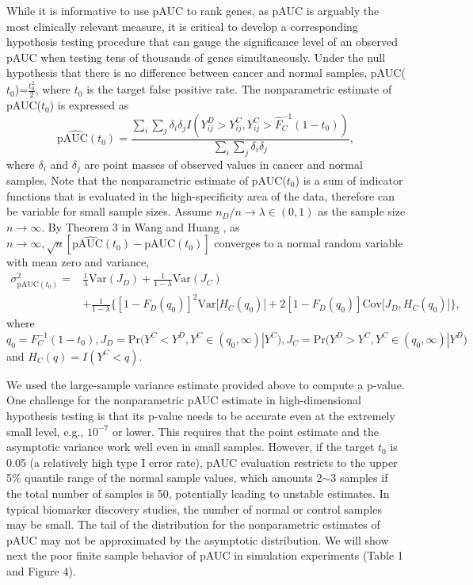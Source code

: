 \documentclass{statsoc}
\begin{document}
While it is informative to use pAUC to rank genes, as pAUC is arguably the most clinically relevant measure, it is critical to develop a corresponding hypothesis testing procedure that can gauge the significance level of an observed pAUC when testing tens of thousands of genes simultaneously. Under the null hypothesis that there is no difference between cancer and normal samples,  pAUC($t_0$)=$\frac{t_0^2}{2}$, where $t_0$ is the target false positive rate. The nonparametric estimate of pAUC($t_0$) is expressed as
\begin{equation}
\mbox{p}\widehat{\mbox{AUC}}(t_0) = \frac{\sum_i \sum_j \delta_i \delta_j I(Y_{ij}^D > Y_{ij}^C, Y_{ij}^C > \hat{F}^{-1}_C(1-t_0))}{\sum_i \sum_j \delta_i \delta_j}, \nonumber
\end{equation}
where $\delta_i$ and $\delta_j$ are point masses of observed values in cancer and normal samples.  Note that the nonparametric estimate of pAUC($t_0$) is a sum of indicator functions that is evaluated in the high-specificity area of the data, therefore can be variable for small sample sizes.  Assume $n_D/n \rightarrow \lambda \in (0,1)$ as the sample size $n \rightarrow \infty$.  By Theorem 3 in Wang and Huang \citep{Wang2019},  as $n \rightarrow \infty, \sqrt{n}[\mbox{p}\widehat{\mbox{AUC}}(t_0)-\mbox{pAUC}(t_0)]$ converges to a normal random variable with mean zero and variance,
\begin{align*}
    \sigma_{\mbox{pAUC}(t_0)}^2 = & \frac{1}{\lambda}\mbox{Var}(J_D)+ \frac{1}{1-\lambda}\mbox{Var}(J_C) \\
    &+ \frac{1}{1-\lambda}\Big\{[1-F_D(q_0)]^2\mbox{Var}\big[H_C(q_0)\big]+2[1-F_D(q_0)]\mbox{Cov}\big[J_D,H_C(q_0)\big]\Big\},
\end{align*}
where $q_0=F_C^{-1}(1-t_0), J_D=\mbox{Pr}\big(Y^C<Y^D,Y^C\in (q_0,\infty)|Y^C\big), J_C=\mbox{Pr}\big(Y^D>Y^C,Y^C\in (q_0,\infty)|Y^D\big)$ and $H_C(q)=I(Y^C<q)$.

We used the large-sample variance estimate provided above to compute a p-value. One challenge for the nonparametric pAUC estimate in high-dimensional hypothesis testing is that its p-value needs to be accurate even at the extremely small level, e.g., $10^{-7}$ or lower. This requires that the point estimate and the asymptotic variance work well even in small samples. However, if the target $t_0$ is 0.05 (a relatively high type I error rate), pAUC evaluation restricts to the upper 5\% quantile range of the normal sample values, which amounts 2$\sim$3 samples if the total number of samples is 50, potentially leading to unstable estimates. In typical biomarker discovery studies, the number of normal or control samples may be small. The tail of the distribution for the nonparametric estimates of pAUC may not be approximated by the asymptotic distribution. We will show next the poor finite sample behavior of pAUC in simulation experiments (Table 1 and Figure 4).
\end{document}
